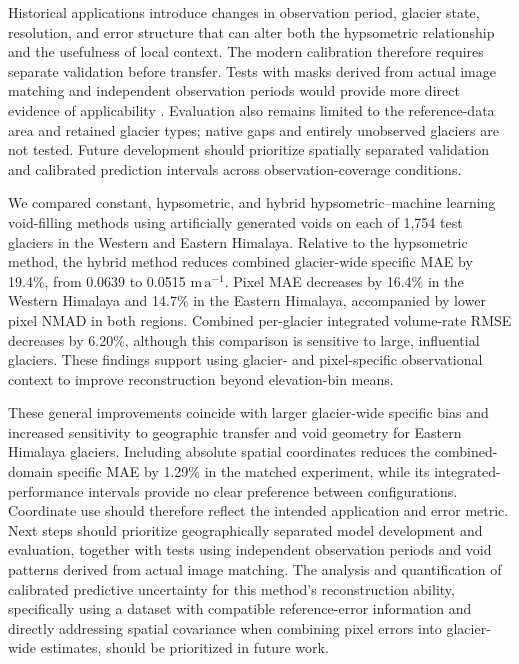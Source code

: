 \documentclass[tc,manuscript]{copernicus}
\newcommand{\rate}{\ensuremath{\mathrm{m\,a^{-1}}}}
\begin{document}
Historical applications introduce changes in observation period, glacier state, resolution, and error structure that can alter both the hypsometric relationship and the usefulness of local context. The modern calibration therefore requires separate validation before transfer. Tests with masks derived from actual image matching and independent observation periods would provide more direct evidence of applicability \citep{mcnabb2019}. Evaluation also remains limited to the reference-data area and retained glacier types; native gaps and entirely unobserved glaciers are not tested. Future development should prioritize spatially separated validation and calibrated prediction intervals across observation-coverage conditions.

\conclusions[Conclusions]
We compared constant, hypsometric, and hybrid hypsometric--machine learning void-filling methods using artificially generated voids on each of 1,754 test glaciers in the Western and Eastern Himalaya. Relative to the hypsometric method, the hybrid method reduces combined glacier-wide specific MAE by 19.4\%, from 0.0639 to 0.0515 \rate. Pixel MAE decreases by 16.4\% in the Western Himalaya and 14.7\% in the Eastern Himalaya, accompanied by lower pixel NMAD in both regions. Combined per-glacier integrated volume-rate RMSE decreases by 6.20\%, although this comparison is sensitive to large, influential glaciers. These findings support using glacier- and pixel-specific observational context to improve reconstruction beyond elevation-bin means.

These general improvements coincide with larger glacier-wide specific bias and increased sensitivity to geographic transfer and void geometry for Eastern Himalaya glaciers. Including absolute spatial coordinates reduces the combined-domain specific MAE by 1.29\% in the matched experiment, while its integrated-performance intervals provide no clear preference between configurations. Coordinate use should therefore reflect the intended application and error metric. Next steps should prioritize geographically separated model development and evaluation, together with tests using independent observation periods and void patterns derived from actual image matching. The analysis and quantification of calibrated predictive uncertainty for this method's reconstruction ability, specifically using a dataset with compatible reference-error information and directly addressing spatial covariance when combining pixel errors into glacier-wide estimates, should be prioritized in future work.
\end{document}
